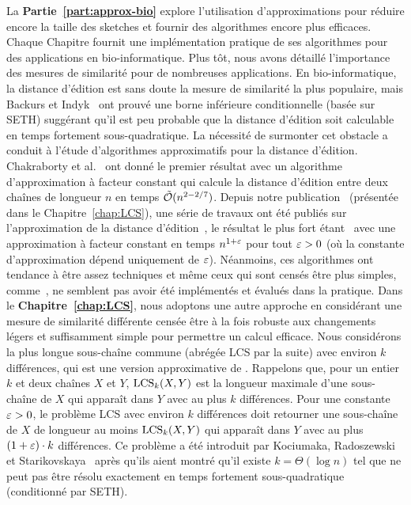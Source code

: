 La \textbf{Partie~\ref{part:approx-bio}} explore l'utilisation d'approximations pour réduire encore la taille des sketches et fournir des algorithmes encore plus efficaces. Chaque Chapitre fournit une implémentation pratique de ses algorithmes pour des applications en bio-informatique.
%
Plus tôt, nous avons détaillé l'importance des mesures de similarité pour de nombreuses applications.
%
En bio-informatique, la distance d'édition est sans doute la mesure de similarité la plus populaire, mais Backurs et Indyk~\cite{DBLP:conf/stoc/BackursI15} ont prouvé une borne inférieure conditionnelle (basée sur SETH) suggérant qu'il est peu probable que la distance d'édition soit calculable en temps fortement sous-quadratique.
%
La nécessité de surmonter cet obstacle a conduit à l'étude d'algorithmes approximatifs pour la distance d'édition. Chakraborty et al.~\cite{DBLP:conf/focs/ChakrabortyDGKS18} ont donné le premier résultat avec un algorithme d'approximation à facteur constant qui calcule la distance d'édition entre deux chaînes de longueur $n$ en temps $\tilde{\mathcal{O}}(n^{2-2/7})$.
Depuis notre publication~\cite{DBLP:conf/cpm/GourdelKRS20} (présentée dans le Chapitre~\ref{chap:LCS}), une série de travaux ont été publiés sur l'approximation de la distance d'édition~\cite{brakensiek2020constant,koucky2020constant}, le résultat le plus fort étant~\cite{andoni2020edit} avec une approximation à facteur constant en temps $n^{1+\varepsilon}$ pour tout $\varepsilon>0$ (où la constante d'approximation dépend uniquement de $\varepsilon$).
Néanmoins, ces algorithmes ont tendance à être assez techniques et même ceux qui sont censés être plus simples, comme~\cite{andoni2020simple}, ne semblent pas avoir été implémentés et évalués dans la pratique.
%
Dans le \textbf{Chapitre~\ref{chap:LCS}}, nous adoptons une autre approche en considérant une mesure de similarité différente censée être à la fois robuste aux changements légers et suffisamment simple pour permettre un calcul efficace. Nous considérons la plus longue sous-chaîne commune (abrégée LCS par la suite) avec environ $k$ différences, qui est une version approximative de \kLCS. Rappelons que, pour un entier $k$ et deux chaînes $X$ et $Y$, $\mathrm{LCS}_{k}(X,Y)$ est la longueur maximale d'une sous-chaîne de $X$ qui apparaît dans $Y$ avec au plus $k$ différences.
Pour une constante $\varepsilon > 0$, le problème LCS avec environ $k$ différences doit retourner une sous-chaîne de $X$ de longueur au moins $\mathrm{LCS}_{k}(X,Y)$ qui apparaît dans $Y$ avec au plus $(1+\varepsilon) \cdot k$ différences. Ce problème a été introduit par Kociumaka, Radoszewski et Starikovskaya~\cite{DBLP:journals/algorithmica/KociumakaRS19} après qu'ils aient montré qu'il existe $k=\Theta(\log n)$ tel que \kLCS ne peut pas être résolu exactement en temps fortement sous-quadratique (conditionné par SETH).
